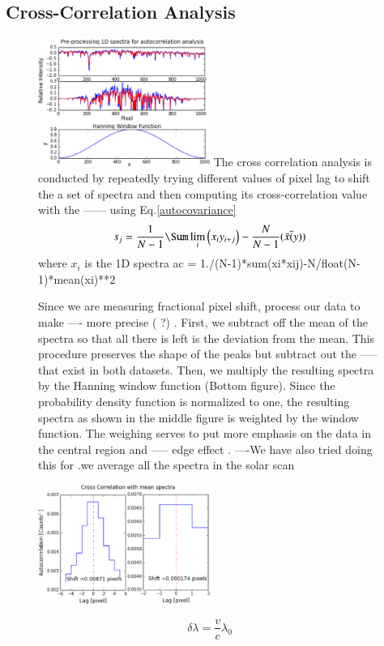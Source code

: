 \documentclass[authoryear, 12pt,5p, times]{elsarticle}
\begin{document}
\subsection{Cross-Correlation Analysis}
\begin{figure}[h!]
\includegraphics[width=0.5\textwidth]{figures/process_corr_spectra}
The cross correlation analysis is conducted by repeatedly trying different values of pixel lag to shift the a set of spectra and then computing its cross-correlation value with the ------  using Eq.\ref{autocovariance} 
\begin{equation}
s_j = \frac{1}{N-1}\Sum\lim_i \Big(x_i y_{i+j}\Big)-\frac{N}{N-1}(\bar{x}\bar(y))
\label{autocovariance}
\end{equation}
where $x_i$ is the 1D spectra
    ac = 1./(N-1)*sum(xi*xij)-N/float(N-1)*mean(xi)**2
\caption{Since we are measuring fractional pixel shift, process our data to make ---- more precise ( ?) . 
First, we subtract off the mean of the spectra so that all there is left is the deviation from the mean. This procedure preserves the shape of the peaks  but subtract out the ----- that exist in both datasets. Then, we multiply the resulting spectra by the Hanning window function (Bottom figure). Since the probability density function is normalized to one, the resulting spectra as shown in the middle figure is weighted by the window function. The weighing serves to put more emphasis on the data in the central region and ----- edge effect .   ----We have also tried doing this for .we average all the spectra in the solar scan }
\label{process_corr_spectra}
\end{figure}
\begin{figure}[h!]
\includegraphics[width=0.5\textwidth]{figures/autocorr_curve}
\caption{}
\label{autocorr_curve}
\end{figure}
\begin{equation}
\delta\lambda=\frac{v}{c}\lambda_0
\label{doppler_eq}
\end{equation}
\end{document}

